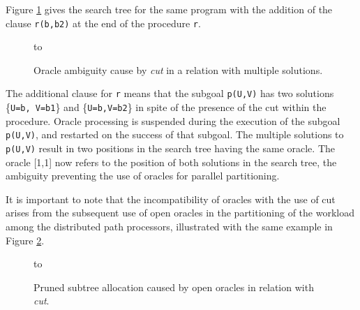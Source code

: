 Figure \ref{cut_det_tree2} gives the search tree for the same program with the addition of
the clause \texttt{r(b,b2)} at the end of the procedure \texttt{r}.

\begin{figure}[htbp]
\vspace{5mm} \hbox to 
\caption{Oracle ambiguity cause by \textit{cut} in a relation with multiple solutions.}
\vspace{5mm}
\label{cut_det_tree2}
\end{figure}

The additional clause for \texttt{r} means that the subgoal \texttt{p(U,V)} has two
solutions \{\texttt{U=b, V=b1}\} and \{\texttt{U=b,V=b2}\} in spite of the presence of
the cut within the procedure.  Oracle processing is suspended during the execution
of the subgoal \texttt{p(U,V)}, and restarted on the success of that subgoal.  The
multiple solutions to \texttt{p(U,V)} result in two positions in the search tree having
the same oracle.  The oracle [1,1] now refers to the position of both solutions in the
search tree, the ambiguity preventing the use of oracles for parallel partitioning.

It is important to note that the incompatibility of oracles with the use of
cut arises from the subsequent use of
open oracles in the partitioning of the workload among the distributed path processors,
illustrated with the same example in Figure \ref{cut_det_tree3}.

\begin{figure}[htbp]
\vspace{5mm} \hbox to 
\caption{Pruned subtree allocation caused by open oracles in relation with \textit{cut}.}
\vspace{5mm}
\label{cut_det_tree3}
\end{figure}

